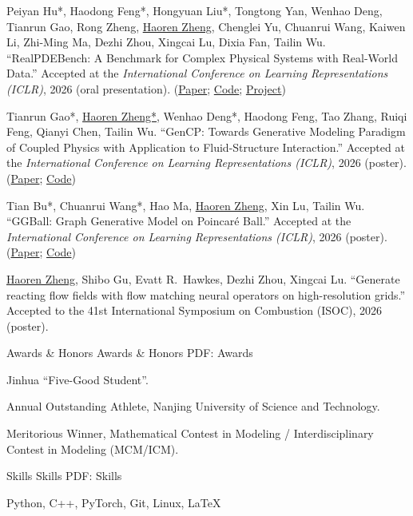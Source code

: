 \documentclass[letterpaper,MMMyyyy,nonstopmode]{simpleresumecv}
\begin{document}
\begin{Body}
\Gap
\NumberedItem{[3]}
Peiyan Hu*, Haodong Feng*, Hongyuan Liu*, Tongtong Yan, Wenhao Deng, Tianrun Gao, Rong Zheng, \underline{Haoren Zheng}, Chenglei Yu, Chuanrui Wang, Kaiwen Li, Zhi-Ming Ma, Dezhi Zhou, Xingcai Lu, Dixia Fan, Tailin Wu.
``RealPDEBench: A Benchmark for Complex Physical Systems with Real-World Data.''
Accepted at the \textit{International Conference on Learning Representations (ICLR)}, 2026 (oral presentation).
(\href{https://arxiv.org/abs/2601.01829v1}{Paper};
\href{https://github.com/AI4Science-WestlakeU/RealPDEBench}{Code};
\href{https://realpdebench.github.io/}{Project})

\Gap
\NumberedItem{[4]}
Tianrun Gao*, \underline{Haoren Zheng*}, Wenhao Deng*, Haodong Feng, Tao Zhang, Ruiqi Feng, Qianyi Chen, Tailin Wu.
``GenCP: Towards Generative Modeling Paradigm of Coupled Physics with Application to Fluid-Structure Interaction.''
Accepted at the \textit{International Conference on Learning Representations (ICLR)}, 2026 (poster).
(\href{https://arxiv.org/abs/2601.19541}{Paper};
\href{https://github.com/AI4Science-WestlakeU/GenCP}{Code})

\Gap
\NumberedItem{[5]}
Tian Bu*, Chuanrui Wang*, Hao Ma, \underline{Haoren Zheng}, Xin Lu, Tailin Wu.
``GGBall: Graph Generative Model on Poincar\'e Ball.''
Accepted at the \textit{International Conference on Learning Representations (ICLR)}, 2026 (poster).
(\href{https://arxiv.org/abs/2506.07198}{Paper};
\href{https://github.com/AI4Science-WestlakeU/GGBall}{Code})

\Gap
\NumberedItem{[6]}
\underline{Haoren Zheng}, Shibo Gu, Evatt R.~Hawkes, Dezhi Zhou, Xingcai Lu.
``Generate reacting flow fields with flow matching neural operators on high-resolution grids.''
Accepted to the 41st International Symposium on Combustion (ISOC), 2026 (poster).

\endgroup

\Section
{Awards \& Honors}
{Awards \& Honors}
{PDF: Awards}

\BulletItem
Jinhua ``Five-Good Student''.
\hfill
{}

\Gap
\BulletItem
Annual Outstanding Athlete, Nanjing University of Science and Technology.
\hfill
{}

\Gap
\BulletItem
Meritorious Winner, Mathematical Contest in Modeling / Interdisciplinary Contest in Modeling (MCM/ICM).
\hfill
{}

\Section
{Skills}
{Skills}
{PDF: Skills}

\Entry
Python, C++, PyTorch, Git, Linux, \LaTeX


\end{Body}
\end{document}
